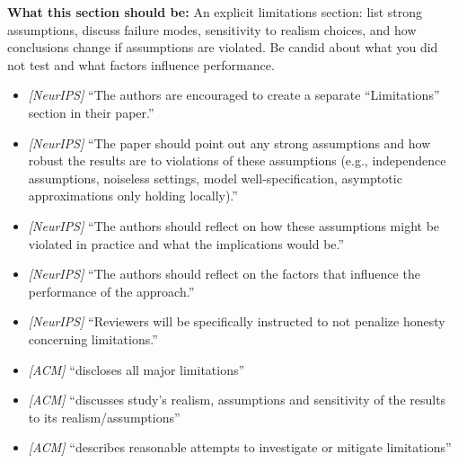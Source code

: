 \noindent\textbf{What this section should be:}
An explicit limitations section: list strong assumptions, discuss failure modes, sensitivity to realism choices, and how conclusions change if assumptions are violated. Be candid about what you did not test and what factors influence performance.
\begin{itemize}
  \item \textit{[NeurIPS]} ``The authors are encouraged to create a separate ``Limitations'' section in their paper.''
  \item \textit{[NeurIPS]} ``The paper should point out any strong assumptions and how robust the results are to violations of these assumptions (e.g., independence assumptions, noiseless settings, model well-specification, asymptotic approximations only holding locally).''
  \item \textit{[NeurIPS]} ``The authors should reflect on how these assumptions might be violated in practice and what the implications would be.''
  \item \textit{[NeurIPS]} ``The authors should reflect on the factors that influence the performance of the approach.''
  \item \textit{[NeurIPS]} ``Reviewers will be specifically instructed to not penalize honesty concerning limitations.''
  \item \textit{[ACM]} ``discloses all major limitations''
  \item \textit{[ACM]} ``discusses study’s realism, assumptions and sensitivity of the results to its realism/assumptions''
  \item \textit{[ACM]} ``describes reasonable attempts to investigate or mitigate limitations''
\end{itemize}